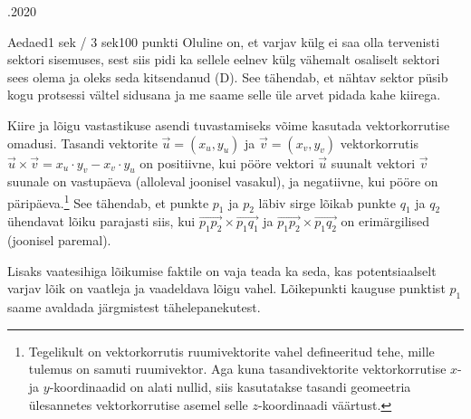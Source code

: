 \documentclass[a4paper,11pt]{article}
\begin{document}
\begin{ol}{\eio}{.2020}{\lah}{}
\begin{yl}{1}{Aed}{aed}{1 sek / 3 sek}{100 punkti}
Oluline on, et varjav külg ei saa olla tervenisti sektori sisemuses, sest siis pidi ka sellele eelnev külg vähemalt osaliselt sektori sees olema ja oleks seda kitsendanud (D). See tähendab, et nähtav sektor püsib kogu protsessi vältel sidusana ja me saame selle üle arvet pidada kahe kiirega.

Kiire ja lõigu vastastikuse asendi tuvastamiseks võime kasutada vektorkorrutise omadusi. Tasandi vektorite $\vec{u} = (x_u, y_u)$ ja $\vec{v} = (x_v, y_v)$ vektorkorrutis $\vec{u} \times \vec{v} = x_u \cdot y_v - x_v \cdot y_u$ on positiivne, kui pööre vektori $\vec{u}$ suunalt vektori $\vec{v}$ suunale on vastupäeva (alloleval joonisel vasakul), ja negatiivne, kui pööre on päripäeva.\footnote{Tegelikult on vektorkorrutis ruumivektorite vahel defineeritud tehe, mille tulemus on samuti ruumivektor. Aga kuna tasandivektorite vektorkorrutise $x$- ja $y$-koordinaadid on alati nullid, siis kasutatakse tasandi geomeetria ülesannetes vektorkorrutise asemel selle $z$-koordinaadi väärtust.} See tähendab, et punkte $p_1$ ja $p_2$ läbiv sirge lõikab punkte $q_1$ ja $q_2$ ühendavat lõiku parajasti siis, kui $\vec{p_1 p_2} \times \vec{p_1 q_1}$ ja $\vec{p_1 p_2} \times \vec{p_1 q_2}$ on erimärgilised (joonisel paremal).

\begin{center}
\hskip 3cm
\end{center}

Lisaks vaatesihiga lõikumise faktile on vaja teada ka seda, kas potentsiaalselt varjav lõik on vaatleja ja vaadeldava lõigu vahel. Lõikepunkti kauguse punktist $p_1$ saame avaldada järgmistest tähelepanekutest.


\end{yl}
\end{ol}
\end{document}
